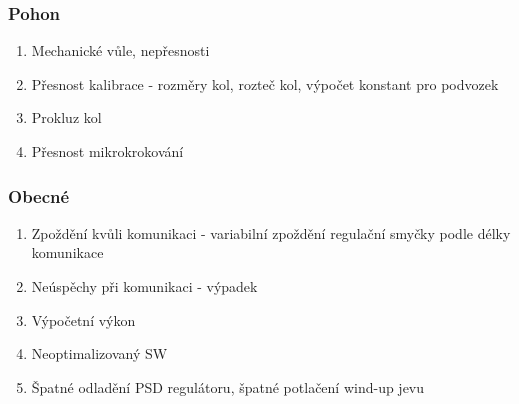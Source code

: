 \subsubsection{Pohon}
\begin{enumerate}
    \item Mechanické vůle, nepřesnosti
    \item Přesnost kalibrace - rozměry kol, rozteč kol, výpočet konstant pro podvozek
    \item Prokluz kol
    \item Přesnost mikrokrokování
\end{enumerate}

\subsubsection{Obecné}
\begin{enumerate}
    \item Zpoždění kvůli komunikaci - variabilní zpoždění regulační smyčky podle délky komunikace
    \item Neúspěchy při komunikaci - výpadek
    \item Výpočetní výkon
    \item Neoptimalizovaný SW
    \item Špatné odladění PSD regulátoru, špatné potlačení wind-up jevu
\end{enumerate}
